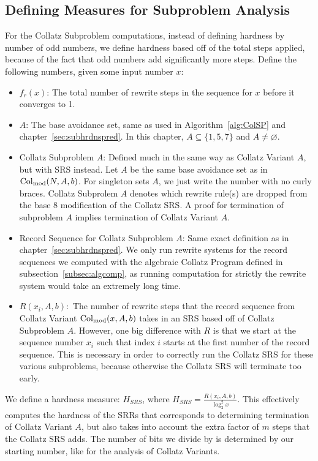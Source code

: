 \subsection{Defining Measures for Subproblem Analysis} \label{subsec:rewritemeasuredefs}
For the Collatz Subproblem computations, instead of defining hardness by number of odd numbers, we define hardness based off of the total steps applied, because of the fact that odd numbers add significantly more steps. Define the following numbers, given some input number $x$:
\begin{itemize}
    \item $f_r(x)$: The total number of rewrite steps in the sequence for $x$ before it converges to 1.
    \item $A$: The base avoidance set, same as used in Algorithm~\ref{alg:ColSP} and chapter~\ref{sec:subhrdnspred}. In this chapter, $A \subseteq \{1, 5, 7\}$ and $A \ne \varnothing$. 
    \item Collatz Subproblem $A$: Defined much in the same way as Collatz Variant $A$, but with SRS instead. Let $A$ be the same base avoidance set as in $\mathrm{Col}_{\text{mod}}(N,A,b)$. For singleton sets $A$, we just write the number with no curly braces. Collatz Subprolem $A$ denotes which rewrite rule(s) are dropped from the base 8 modification of the Collatz SRS. A proof for termination of subproblem $A$ implies termination of Collatz Variant $A$.
    \item Record Sequence for Collatz Subproblem $A$: Same exact definition as in chapter~\ref{sec:subhrdnspred}. We only run rewrite systems for the record sequences we computed with the algebraic Collatz Program defined in subsection~\ref{subsec:algcomp}, as running computation for strictly the rewrite system would take an extremely long time.
    \item $R(x_i, A, b):$ The number of rewrite steps that the record sequence from Collatz Variant $\mathrm{Col}_{\text{mod}}(x,A,b)$ takes in an SRS based off of Collatz Subproblem $A$. However, one big difference with $R$ is that we start at the sequence number $x_i$ such that index $i$ starts at the first number of the record sequence. This is necessary in order to correctly run the Collatz SRS for these various subproblems, because otherwise the Collatz SRS will terminate too early.
\end{itemize}
We define a hardness measure: $H_{SRS}$, where $H_{SRS} = \frac{R(x_i, A, b)}{\log_2^2{x}}$. This effectively computes the hardness of the SRRs that corresponds to determining termination of Collatz Variant $A$, but also takes into account the extra factor of $m$ steps that the Collatz SRS adds. The number of bits we divide by is determined by our starting number, like for the analysis of Collatz Variants.

